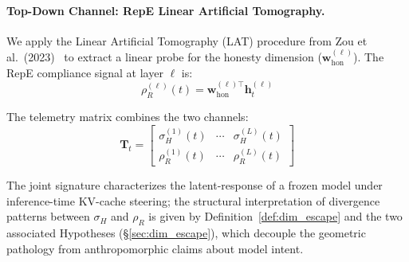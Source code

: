 
\paragraph{Top-Down Channel: RepE Linear Artificial Tomography.}
We apply the Linear Artificial Tomography (LAT) procedure from Zou et al.\ (2023)~\cite{zou2023repe} to extract a linear probe for the honesty dimension ($\mathbf{w}_{\text{hon}}^{(\ell)}$). The RepE compliance signal at layer $\ell$ is:
\begin{equation}
\rho_R^{(\ell)}(t) = \mathbf{w}_{\text{hon}}^{(\ell)\top} \mathbf{h}_t^{(\ell)}
\label{eq:repe_signal}
\end{equation}

The telemetry matrix combines the two channels:
\begin{equation}
\mathbf{T}_t = \begin{bmatrix} \sigma_H^{(1)}(t) & \cdots & \sigma_H^{(L)}(t) \\ \rho_R^{(1)}(t) & \cdots & \rho_R^{(L)}(t) \end{bmatrix}
\label{eq:telemetry_matrix}
\end{equation}

The joint signature characterizes the latent-response of a frozen model under inference-time KV-cache steering; the structural interpretation of divergence patterns between $\sigma_H$ and $\rho_R$ is given by Definition~\ref{def:dim_escape} and the two associated Hypotheses (§\ref{sec:dim_escape}), which decouple the geometric pathology from anthropomorphic claims about model intent.

